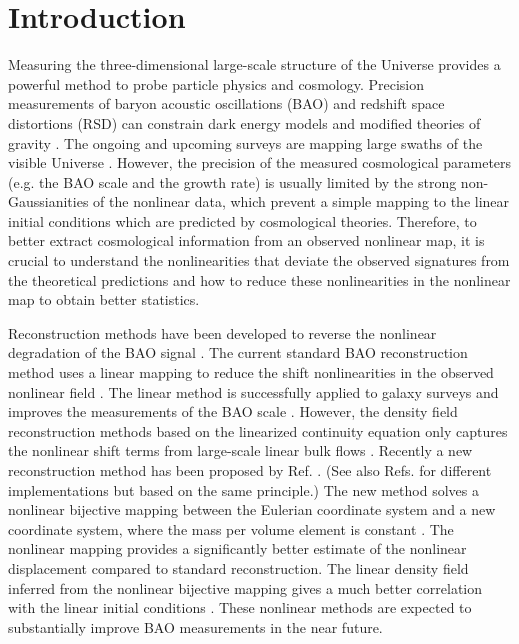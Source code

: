 \documentclass[aps,prx,twocolumn,superscriptaddress,groupedaddress,nofootinbib,amsfont]{revtex4}  %
\begin{document}
\pacs{}
\maketitle


\section{Introduction}
Measuring the three-dimensional large-scale structure of the Universe provides
a powerful method to probe particle physics and cosmology.
Precision measurements of baryon acoustic oscillations (BAO) and redshift space
distortions (RSD) can constrain dark energy models and modified theories of
gravity \cite{2016sdss,2017F,2017R,2016V,2017F2,2017G,2017S,2016S,2017Z}. 
The ongoing and upcoming surveys are mapping large swaths of the visible 
Universe \cite{2016sdss,CHIME,tianlai,DESI,pfs}.
However, the precision of the measured cosmological parameters (e.g. the BAO 
scale and the growth rate) is usually limited by the strong non-Gaussianities
of the nonlinear data, which prevent a simple mapping to the linear initial 
conditions which are predicted by cosmological theories. 
Therefore, to better extract cosmological information from an observed nonlinear
map, it is crucial to understand the nonlinearities that deviate the observed 
signatures from the theoretical predictions and how to reduce these 
nonlinearities in the nonlinear map to obtain better statistics.

Reconstruction methods have been developed to reverse the nonlinear degradation
of the BAO signal \cite{2007bao,2012TZ2,2015marcel,2017BAOP}. 
The current standard BAO reconstruction method uses a linear mapping to reduce
the shift nonlinearities in the observed nonlinear field \cite{2007bao}.
The linear method is successfully applied to galaxy surveys and improves the
measurements of the BAO scale \cite{2012nikhil,2012Anderson,2014K,2014Anderson,2014T,2015Ross,2017F,2017R}.
However, the density field reconstruction methods based on the linearized 
continuity equation only captures the nonlinear shift terms from large-scale
linear bulk flows \cite{2007ESW,2009PWC,2009NWP,2012TZ,2014Tassev,2016Seo}.
Recently a new reconstruction method has been proposed by Ref. \cite{2016HMZ}. 
(See also Refs. \cite{2017Marcel,2017Shi} for different implementations but 
based on the same principle.)
The new method solves a nonlinear bijective mapping between the Eulerian 
coordinate system and a new coordinate system, where the mass per volume 
element is constant \cite{2016HMZ}. 
The nonlinear mapping provides a significantly better estimate of the nonlinear
displacement compared to standard reconstruction.
The linear density field inferred from the nonlinear bijective mapping gives a
much better correlation with the linear initial conditions \cite{2016HMZ}.
These nonlinear methods are expected to substantially improve BAO measurements 
in the near future.
\end{document}
